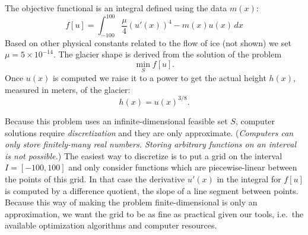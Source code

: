 \documentclass[11pt]{amsart}
\begin{document}
\begin{enumerate}
The objective functional is an integral defined using the data $m(x)$:
    $$f[u] = \int_{-100}^{100} \frac{\mu}{4} \left(u'(x)\right)^4 - m(x) u(x)\,dx$$
Based on other physical constants related to the flow of ice (not shown) we set $\mu = 5 \times 10^{-14}$.  The glacier shape is derived from the solution of the problem
    $$\min_S f[u].$$
Once $u(x)$ is computed we raise it to a power to get the actual height $h(x)$, measured in meters, of the glacier:
    $$h(x) = u(x)^{3/8}.$$  %

Because this problem uses an infinite-dimensional feasible set $S$, computer solutions require \emph{discretization} and they are only approximate.  (\emph{Computers can only store finitely-many real numbers.  Storing arbitrary functions on an interval is not possible.})  The easiest way to discretize is to put a grid on the interval $I=[-100,100]$ and only consider functions which are piecewise-linear between the points of this grid.  In that case the derivative $u'(x)$ in the integral for $f[u]$ is computed by a difference quotient, the slope of a line segment between points.  Because this way of making the problem finite-dimensional is only an approximation, we want the grid to be as fine as practical given our tools, i.e.~the available optimization algorithms and computer resources.

\end{enumerate}
\end{document}
